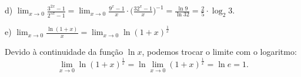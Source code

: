 \documentclass{article}
\begin{document}
{\begin{newpage}
\vspace{0.3cm}
d) $\displaystyle{\lim_{x\to 0} \frac{3^{2x} - 1}{2^{5x} - 1} = \lim_{x\to 0} \frac{9^x - 1}{x}\cdot\Big(\frac{32^x - 1}{x}\Big)^{-1} = \frac{\ln{9}}{\ln{32}} = \frac{2}{5}\cdot\log_2{3}}$.
\par
\vspace{0.3cm}
e) $\displaystyle{\lim_{x\to 0} \frac{\ln{(1+x)}}{x} = \lim_{x\to 0} \ln{(1+x)^{\frac{1}{x}}}}$
\par
\vspace{0.3cm}
Devido à continuidade da função $\ln{x}$, podemos trocar o limite com o logaritmo:
\begin{equation*} \displaystyle{\lim_{x\to 0}} \ln{(1+x)^{\frac{1}{x}}} = \ln{\displaystyle{\lim_{x\to 0}} (1+x)^{\frac{1}{x}}} = \ln{e} = 1.\end{equation*}
\par
\vspace{0.3cm}

\end{newpage}}
\end{document}
